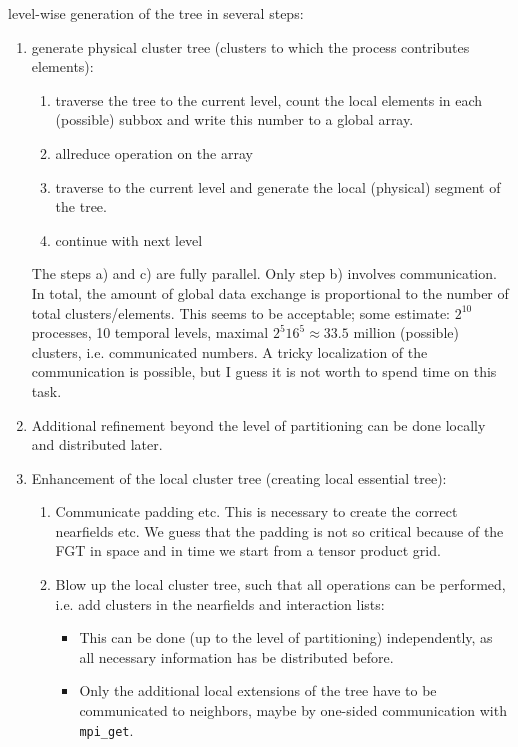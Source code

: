 \documentclass[a4paper,11pt]{article}
\theoremstyle{plain}
\theoremstyle{definition}
\theoremstyle{remark}
\begin{document}
level-wise generation of the tree in several steps:
\begin{enumerate}
  \item generate physical cluster tree (clusters to which the process
    contributes elements):
    \begin{enumerate}
      \item traverse the tree to the current level, count the local elements in
        each (possible) subbox and write this number to a global array.
      \item allreduce operation on the array
      \item traverse to the current level and generate the local (physical)
        segment of the tree.
      \item continue with next level
    \end{enumerate}
    The steps a) and c) are fully parallel. Only step b) involves communication. In
    total, the amount of global data exchange is proportional to the number of total
    clusters/elements. This seems to be acceptable; some estimate:
    $2^{10}$ processes, 10 temporal levels, maximal $2^5 16^5 \approx 33.5$
    million (possible) clusters, i.e. communicated numbers.
    A tricky localization of the communication is possible, but I guess it is not
    worth to spend  time on this task.
  \item Additional refinement beyond the level of partitioning can be done
      locally and distributed later. 
\item Enhancement of the local cluster tree (creating local essential tree):
  \begin{enumerate}
  \item Communicate padding etc. This is necessary to create the correct
    nearfields etc. We guess that the padding is not so critical
    because of the FGT in space and in time we start from a tensor product grid.
  \item Blow up the local cluster tree, such that all operations can be
    performed, i.e. add clusters in the nearfields and interaction lists:
    \begin{itemize}
    \item This can be done (up to the level of partitioning) independently, as all necessary information has be
    distributed before.
    \item Only the additional local extensions of the tree have to be
      communicated to neighbors, maybe by one-sided communication with \texttt{mpi\_get}. 
    \end{itemize}
  \end{enumerate}
\end{enumerate}
\end{document}
